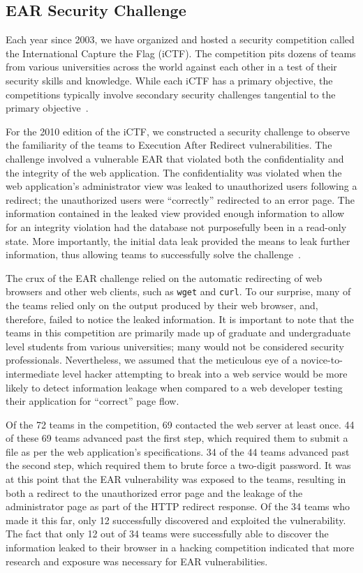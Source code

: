 \subsection{EAR Security Challenge}
Each year since 2003, we have organized and hosted a security competition
called the International Capture the Flag (iCTF). The competition pits
dozens of teams from various universities across the world against each
other in a test of their security skills and knowledge. While each iCTF has a primary
objective, the competitions typically involve secondary security challenges
tangential to the primary
objective~\cite{childers10:ictf}.

For the 2010 edition of the iCTF, we constructed a security challenge to
observe the familiarity of the teams to Execution After Redirect
vulnerabilities. The challenge involved a vulnerable EAR that violated both
the confidentiality and the integrity of the web application. The
confidentiality was violated when the web application's administrator view
was leaked to unauthorized users following a redirect; the unauthorized
users were ``correctly'' redirected to an error page. The information
contained in the leaked view provided enough information to allow for an
integrity violation had the database not purposefully been in a read-only
state. More importantly, the initial data leak provided the means to leak
further information, thus allowing teams to successfully solve the
challenge~\cite{boe11:earchallenge}.

The crux of the EAR challenge relied on the automatic redirecting of web
browsers and other web clients, such as \texttt{wget} and \texttt{curl}. To
our surprise, many of the teams relied only on the output produced by their
web browser, and, therefore, failed to notice the leaked information. It is
important to note that the teams in this competition are primarily made up
of graduate and undergraduate level students from various universities;
many would not be considered security professionals. Nevertheless, we
assumed that the meticulous eye of a novice-to-intermediate level hacker
attempting to break into a web service would be more likely to detect
information leakage when compared to a web developer testing their
application for ``correct'' page flow.

Of the 72 teams in the competition, 69 contacted the web server at least
once. 44 of these 69 teams advanced past the first step, which required
them to submit a file as per the web application's specifications. 34 of
the 44 teams advanced past the second step, which required them to brute
force a two-digit password. It was at this point that the EAR vulnerability
was exposed to the teams, resulting in both a redirect to the unauthorized
error page and the leakage of the administrator page as part of the HTTP
redirect response. Of the 34 teams who made it this far, only 12
successfully discovered and exploited the vulnerability. The fact that only
12 out of 34 teams were successfully able to discover the information
leaked to their browser in a hacking competition indicated that more
research and exposure was necessary for EAR vulnerabilities.

